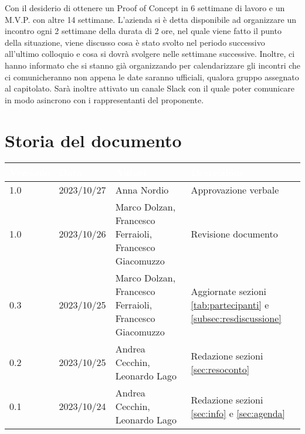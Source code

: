 \documentclass[12pt]{article}
\begin{document}
\begin{enumerate}
Con il desiderio di ottenere un Proof of Concept in 6 settimane di lavoro e un M.V.P. con altre 14 settimane. L'azienda si è detta disponibile ad organizzare un incontro ogni 2 settimane della durata di 2 ore, nel quale viene fatto il punto della situazione, viene discusso cosa è stato svolto nel periodo successivo all'ultimo colloquio e cosa si dovrà svolgere nelle settimane successive. Inoltre, ci hanno informato che si stanno già organizzando per calendarizzare gli incontri che ci comunicheranno non appena le date saranno ufficiali, qualora gruppo assegnato al capitolato.
Sarà inoltre attivato un canale Slack con il quale poter comunicare in modo asincrono con i rappresentanti del proponente.
    
\end{enumerate}

\section{Storia del documento} \label{sec:storia}
\begingroup
\setlength{\tabcolsep}{10pt}
\renewcommand{\arraystretch}{1.5}
\begin{tabularx}{\textwidth}{| l | l | X | X |}
    \hline
    \rowcolor{headerrow} \textbf{\textcolor{white}{Versione}} & \textbf{\textcolor{white}{Data}} & \textbf{\textcolor{white}{Autori}} & \textbf{\textcolor{white}{Descrizione}} \\
    \hline
    1.0 & 2023/10/27 & Anna Nordio & Approvazione verbale \\
    \hline
    \hline
    1.0 & 2023/10/26 & Marco Dolzan, Francesco Ferraioli, Francesco Giacomuzzo & Revisione documento\\
    \hline
    0.3 & 2023/10/25 &Marco Dolzan, Francesco Ferraioli, Francesco Giacomuzzo & Aggiornate sezioni \ref{tab:partecipanti} e \ref{subsec:resdiscussione} \\
    \hline
    0.2 & 2023/10/25 & Andrea Cecchin, Leonardo Lago & Redazione sezioni \ref{sec:resoconto} \\
    \hline
    0.1 & 2023/10/24 & Andrea Cecchin, Leonardo Lago  & Redazione sezioni \ref{sec:info} e \ref{sec:agenda}\\
    \hline
    
    
   
\end{tabularx}
\endgroup
\end{document}
